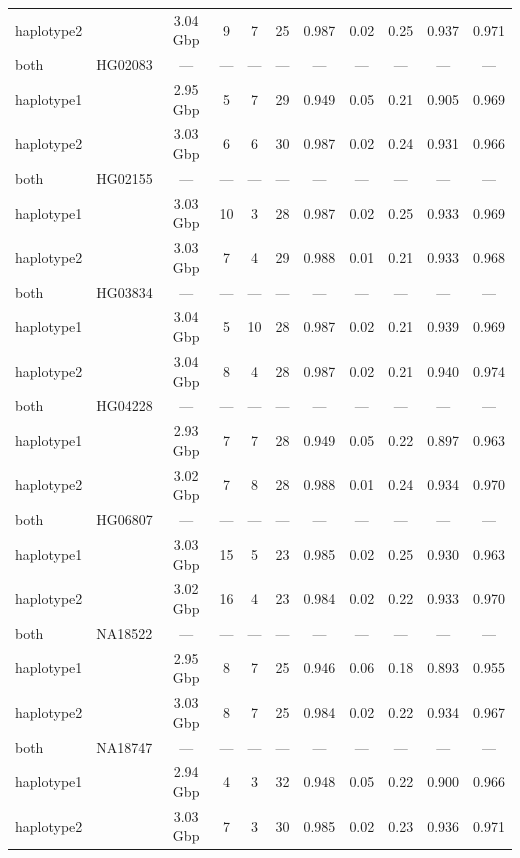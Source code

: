 \begin{table}[t]
\begin{tabular*}{0.9\linewidth}{@{\extracolsep{\fill}}l|lccccccccc}
haplotype2 &  & 3.04 Gbp & 9 & 7 & 25 & 0.987 & 0.02 & 0.25 & 0.937 & 0.971 \\ 
both & {HG02083} & {—} & {—} & {—} & {—} & {—} & {—} & {—} & {—} & {—} \\ 
haplotype1 &  & 2.95 Gbp & 5 & 7 & 29 & 0.949 & 0.05 & 0.21 & 0.905 & 0.969 \\ 
haplotype2 &  & 3.03 Gbp & 6 & 6 & 30 & 0.987 & 0.02 & 0.24 & 0.931 & 0.966 \\ 
both & {HG02155} & {—} & {—} & {—} & {—} & {—} & {—} & {—} & {—} & {—} \\ 
haplotype1 &  & 3.03 Gbp & 10 & 3 & 28 & 0.987 & 0.02 & 0.25 & 0.933 & 0.969 \\ 
haplotype2 &  & 3.03 Gbp & 7 & 4 & 29 & 0.988 & 0.01 & 0.21 & 0.933 & 0.968 \\ 
both & {HG03834} & {—} & {—} & {—} & {—} & {—} & {—} & {—} & {—} & {—} \\ 
haplotype1 &  & 3.04 Gbp & 5 & 10 & 28 & 0.987 & 0.02 & 0.21 & 0.939 & 0.969 \\ 
haplotype2 &  & 3.04 Gbp & 8 & 4 & 28 & 0.987 & 0.02 & 0.21 & 0.940 & 0.974 \\ 
both & {HG04228} & {—} & {—} & {—} & {—} & {—} & {—} & {—} & {—} & {—} \\ 
haplotype1 &  & 2.93 Gbp & 7 & 7 & 28 & 0.949 & 0.05 & 0.22 & 0.897 & 0.963 \\ 
haplotype2 &  & 3.02 Gbp & 7 & 8 & 28 & 0.988 & 0.01 & 0.24 & 0.934 & 0.970 \\ 
both & {HG06807} & {—} & {—} & {—} & {—} & {—} & {—} & {—} & {—} & {—} \\ 
haplotype1 &  & 3.03 Gbp & 15 & 5 & 23 & 0.985 & 0.02 & 0.25 & 0.930 & 0.963 \\ 
haplotype2 &  & 3.02 Gbp & 16 & 4 & 23 & 0.984 & 0.02 & 0.22 & 0.933 & 0.970 \\ 
both & {NA18522} & {—} & {—} & {—} & {—} & {—} & {—} & {—} & {—} & {—} \\ 
haplotype1 &  & 2.95 Gbp & 8 & 7 & 25 & 0.946 & 0.06 & 0.18 & 0.893 & 0.955 \\ 
haplotype2 &  & 3.03 Gbp & 8 & 7 & 25 & 0.984 & 0.02 & 0.22 & 0.934 & 0.967 \\ 
both & {NA18747} & {—} & {—} & {—} & {—} & {—} & {—} & {—} & {—} & {—} \\ 
haplotype1 &  & 2.94 Gbp & 4 & 3 & 32 & 0.948 & 0.05 & 0.22 & 0.900 & 0.966 \\ 
haplotype2 &  & 3.03 Gbp & 7 & 3 & 30 & 0.985 & 0.02 & 0.23 & 0.936 & 0.971 \\ 

\end{tabular*}
\end{table}

